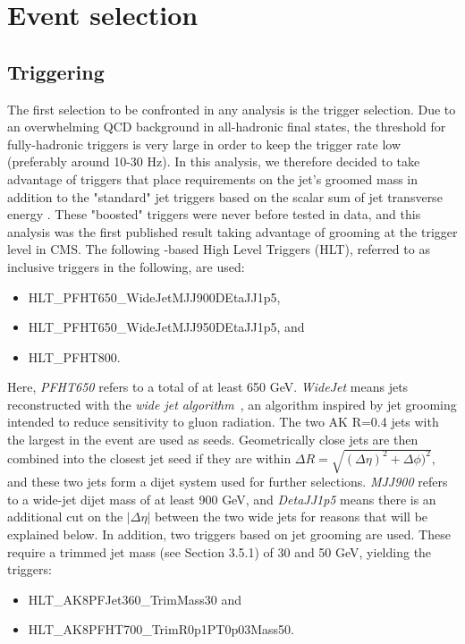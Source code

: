 \section{Event selection}

\subsection{Triggering}
\label{sec:searchI:trigger}
The first selection to be confronted in any analysis is the trigger selection. Due to an overwhelming QCD background in all-hadronic final states, the threshold for fully-hadronic triggers is very large in order to keep the trigger rate low (preferably around 10-30 Hz). In this analysis, we therefore decided to take advantage of triggers that place requirements on the jet's groomed mass in addition to the "standard" jet triggers based on the scalar sum of jet transverse energy \HT. These "boosted" triggers were never before tested in data, and this analysis was the first published result taking advantage of grooming at the trigger level in CMS. The following \HT-based High Level Triggers (HLT), referred to as inclusive triggers in the following, are used:
\begin{itemize}
\item {HLT\_PFHT650\_WideJetMJJ900DEtaJJ1p5},
\item {HLT\_PFHT650\_WideJetMJJ950DEtaJJ1p5}, and
\item {HLT\_PFHT800}.
\end{itemize}
Here, \emph{PFHT650} refers to a total \HT of at least 650 GeV. \emph{WideJet} means jets reconstructed with the \emph{wide jet algorithm}~\cite{2011123}, an algorithm inspired by jet grooming intended to reduce sensitivity to gluon radiation. The two AK R=0.4 jets with the largest \PT in the event are used as seeds. Geometrically close jets are then combined into the closest jet seed if they are within $\Delta R = \sqrt{(\Delta \eta)^2+\Delta \phi)^2}$, and these two jets form a dijet system used for further selections. \emph{MJJ900} refers to a wide-jet dijet mass of at least 900 GeV, and \emph{DetaJJ1p5} means there is an additional cut on the $|\Delta \eta|$ between the two wide jets for reasons that will be explained below. In addition, two triggers based on jet grooming are used. These require a trimmed jet mass (see Section 3.5.1) of 30 and 50 GeV, yielding the triggers:
\begin{itemize}
\item {HLT\_AK8PFJet360\_TrimMass30} and
\item {HLT\_AK8PFHT700\_TrimR0p1PT0p03Mass50}.
\end{itemize}
